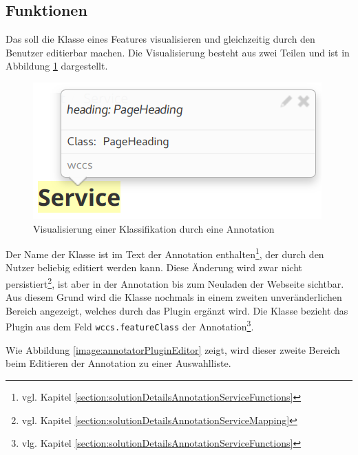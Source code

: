 \subsection{Funktionen}
    Das {\annotatorPlugin} soll die Klasse eines Features visualisieren und gleichzeitig
    durch den Benutzer editierbar machen.
    Die Visualisierung besteht aus zwei Teilen und ist in Abbildung
    \ref{image:annotatorPluginViewer} dargestellt.

    \begin{figure}[htb]
        \centering
        \includegraphics[scale=\screenshotScaleFactor]{../resources/annotator-plugin/viewer.png}
        \caption{Visualisierung einer Klassifikation durch eine Annotation}
        \label{image:annotatorPluginViewer}
    \end{figure}

    Der Name der Klasse ist im Text der Annotation
    enthalten\footnote{vgl. Kapitel \ref{section:solutionDetailsAnnotationServiceFunctions}},
    der durch den Nutzer beliebig editiert werden kann.
    Diese Änderung wird zwar nicht
    persistiert\footnote{vgl. Kapitel \ref{section:solutionDetailsAnnotationServiceMapping}},
    ist aber in der Annotation bis zum Neuladen der Webseite sichtbar.
    Aus diesem Grund wird die Klasse nochmals in einem zweiten unveränderlichen Bereich angezeigt,
    welches durch das Plugin ergänzt wird.
    Die Klasse bezieht das Plugin aus dem Feld \texttt{wccs.featureClass}
    der Annotation\footnote{vlg. Kapitel \ref{section:solutionDetailsAnnotationServiceFunctions}}.

    Wie Abbildung \ref{image:annotatorPluginEditor} zeigt,
    wird dieser zweite Bereich beim Editieren der Annotation zu einer Auswahlliste.

